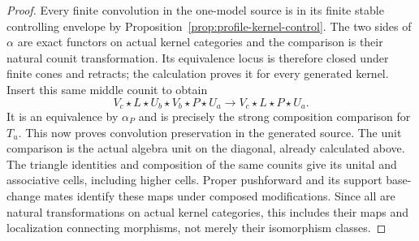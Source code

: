 \documentclass[11pt]{article}
\theoremstyle{definition}
\theoremstyle{remark}
\begin{document}
\begin{proof}
Every finite convolution in the one-model source is in its finite
stable controlling envelope by Proposition~\ref{prop:profile-kernel-control}.
The two sides of $\alpha$ are exact functors on actual kernel
categories and the comparison is their natural counit transformation.
Its equivalence locus is therefore closed under finite cones and
retracts; the calculation proves it for every generated kernel.
Insert this same middle counit to obtain
\[
 V_c\star L\star U_b\star V_b\star P\star U_a
 \longrightarrow V_c\star L\star P\star U_a.
\]
It is an equivalence by $\alpha_P$ and is precisely the strong
composition comparison for $T_u$.  This now proves convolution
preservation in the generated source.  The unit comparison is the
actual algebra unit on the diagonal, already calculated above.
The triangle identities and composition of the same counits give
its unital and associative cells, including higher cells.  Proper
pushforward and its support base-change mates identify these maps
under composed modifications.  Since all are natural transformations
on actual kernel categories, this includes their maps and
localization connecting morphisms, not merely their isomorphism classes.
\end{proof}
\end{document}
